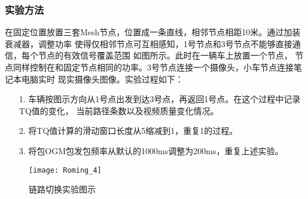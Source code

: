 \renewcommand{\thesubsubsection}{\Alph{subsubsection}.}
\subsubsection{实验方法}
在固定位置放置三套Mesh节点，位置成一条直线，相邻节点相距10米。通过加装衰减器，调整功率
使得仅相邻节点可互相感知，1号节点和3号节点不能够直接通信，每个节点的有效信号覆盖范围
如图所示。此时在一辆车上放置一个节点，
节点同样控制在和固定节点相同的功率。3号节点连接一个摄像头，小车节点连接笔记本电脑实时
现实摄像头图像。实验过程如下：
\begin{itemize}
\item[1.] 车辆按图示方向从1号点出发到达3号点，再返回1号点。在这个过程中记录TQ值的变化，
当前路径条数以及视频质量变化情况。
\item[2.] 将TQ值计算的滑动窗口长度从5缩减到1，重复1的过程。
\item[3.] 将包OGM包发包频率从默认的1000ms调整为200ms，重复上述实验。
\end{itemize}

\begin{figure}[H] %
  \centering
  \texttt{[image: Roming\_4]}
  \caption{链路切换实验图示}
  \label{fig:roming_4}
\end{figure}

